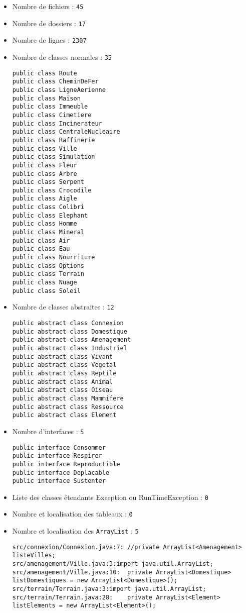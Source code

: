 \documentclass[11pt,a4paper]{article}
\begin{document}
\begin{itemize}
\vspace{1\baselineskip}
\item{Nombre de fichiers : \texttt{45}}
\item{Nombre de dossiers : \texttt{17}}
\item{Nombre de lignes : \texttt{2307}}
\item{Nombre de classes normales : \texttt{35}}
\begin{Verbatim}[xleftmargin=.3in]
public class Route
public class CheminDeFer
public class LigneAerienne
public class Maison
public class Immeuble
public class Cimetiere
public class Incinerateur
public class CentraleNucleaire
public class Raffinerie
public class Ville
public class Simulation
public class Fleur
public class Arbre
public class Serpent
public class Crocodile
public class Aigle
public class Colibri
public class Elephant
public class Homme
public class Mineral
public class Air
public class Eau
public class Nourriture
public class Options
public class Terrain
public class Nuage
public class Soleil
\end{Verbatim}

\item{Nombre de classes abstraites : \texttt{12}}
\begin{Verbatim}[xleftmargin=.3in]
public abstract class Connexion
public abstract class Domestique
public abstract class Amenagement
public abstract class Industriel
public abstract class Vivant
public abstract class Vegetal
public abstract class Reptile
public abstract class Animal
public abstract class Oiseau
public abstract class Mammifere
public abstract class Ressource
public abstract class Element
\end{Verbatim}
\item{Nombre d'interfaces : \texttt{5}}
\begin{Verbatim}[xleftmargin=.3in]
public interface Consommer
public interface Respirer
public interface Reproductible
public interface Deplacable
public interface Sustenter
\end{Verbatim}
\item{Liste des classes étendants Exception ou RunTimeException : \texttt{0}}

\item{Nombre et localisation des tableaux : \texttt{0}}

\item{Nombre et localisation des \texttt{ArrayList} : \texttt{5}}
\begin{Verbatim}[xleftmargin=.3in, breaklines=true, breakanywhere=true]
src/connexion/Connexion.java:7:	//private ArrayList<Amenagement> listeVilles;
src/amenagement/Ville.java:3:import java.util.ArrayList;
src/amenagement/Ville.java:10:	private ArrayList<Domestique> listDomestiques = new ArrayList<Domestique>();
src/terrain/Terrain.java:3:import java.util.ArrayList;
src/terrain/Terrain.java:28:	private ArrayList<Element> listElements = new ArrayList<Element>();
\end{Verbatim}


\end{itemize}
\end{document}
